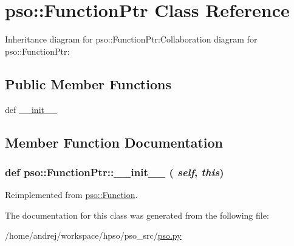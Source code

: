 \hypertarget{classpso_1_1FunctionPtr}{
\section{pso::FunctionPtr Class Reference}
\label{classpso_1_1FunctionPtr}
}
Inheritance diagram for pso::FunctionPtr:Collaboration diagram for pso::FunctionPtr:\subsection*{Public Member Functions}
\begin{CompactItemize}
\item 
def \hyperlink{classpso_1_1FunctionPtr_5370977bbb543767eef37e2dab6e49b9}{\_\-\_\-init\_\-\_\-}
\end{CompactItemize}


\subsection{Member Function Documentation}
\hypertarget{classpso_1_1FunctionPtr_5370977bbb543767eef37e2dab6e49b9}{
\subsubsection{\setlength{\rightskip}{0pt plus 5cm}def pso::FunctionPtr::\_\-\_\-init\_\-\_\- ( {\em self}, \/   {\em this})}}
\label{classpso_1_1FunctionPtr_5370977bbb543767eef37e2dab6e49b9}




Reimplemented from \hyperlink{classpso_1_1Function_6874097c6476dc85af64b40e76a807e9}{pso::Function}.

The documentation for this class was generated from the following file:\begin{CompactItemize}
\item 
/home/andrej/workspace/hpso/pso\_\-src/\hyperlink{pso_8py}{pso.py}\end{CompactItemize}
